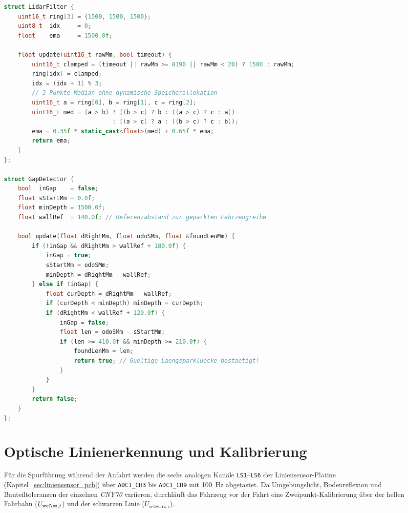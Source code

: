 \begin{lstlisting}[language=C++,caption={Zweistufiger Median-3- und EMA-Distanzfilter sowie Hysterese-Parklückendetektor (C++).},label={lst:gap_filter}]
struct LidarFilter {
    uint16_t ring[3] = {1500, 1500, 1500};
    uint8_t  idx     = 0;
    float    ema     = 1500.0f;

    float update(uint16_t rawMm, bool timeout) {
        uint16_t clamped = (timeout || rawMm >= 8190 || rawMm < 20) ? 1500 : rawMm;
        ring[idx] = clamped;
        idx = (idx + 1) % 3;
        // 3-Punkte-Median ohne dynamische Speicherallokation
        uint16_t a = ring[0], b = ring[1], c = ring[2];
        uint16_t med = (a > b) ? ((b > c) ? b : ((a > c) ? c : a))
                               : ((a > c) ? a : ((b > c) ? c : b));
        ema = 0.35f * static_cast<float>(med) + 0.65f * ema;
        return ema;
    }
};

struct GapDetector {
    bool  inGap    = false;
    float sStartMm = 0.0f;
    float minDepth = 1500.0f;
    float wallRef  = 140.0f; // Referenzabstand zur geparkten Fahrzeugreihe

    bool update(float dRightMm, float odoSMm, float &foundLenMm) {
        if (!inGap && dRightMm > wallRef + 180.0f) {
            inGap = true;
            sStartMm = odoSMm;
            minDepth = dRightMm - wallRef;
        } else if (inGap) {
            float curDepth = dRightMm - wallRef;
            if (curDepth < minDepth) minDepth = curDepth;
            if (dRightMm < wallRef + 120.0f) {
                inGap = false;
                float len = odoSMm - sStartMm;
                if (len >= 410.0f && minDepth >= 210.0f) {
                    foundLenMm = len;
                    return true; // Gueltige Laengsparkluecke bestaetigt!
                }
            }
        }
        return false;
    }
};
\end{lstlisting}

\section{Optische Linienerkennung und Kalibrierung}
\label{sec:linienerkennung}
Für die Spurführung während der Anfahrt werden die sechs analogen Kanäle \texttt{LS1}--\texttt{LS6} der Liniensensor-Platine (Kapitel~\ref{sec:liniensensor_pcb}) über \texttt{ADC1\_CH3} bis \texttt{ADC1\_CH9} mit \qty{100}{\hertz} abgetastet. Da Umgebungslicht, Bodenreflexion und Bauteiltoleranzen der einzelnen \emph{CNY70} variieren, durchläuft das Fahrzeug vor der Fahrt eine Zweipunkt-Kalibrierung über der hellen Fahrbahn ($U_{\mathrm{wei\ss},i}$) und der schwarzen Linie ($U_{\mathrm{schwarz},i}$).

